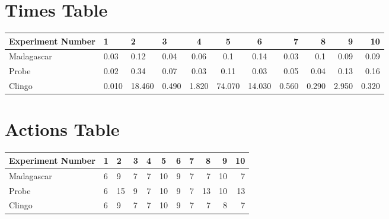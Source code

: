 \documentclass[8pt]{article}
\begin{document}
\begin{landscape}
\section{Times Table}\begin{tabular}{ | l | l | l | l | c | c | c | r | r | r | r | }\hline
Experiment Number & 1 & 2 & 3 & 4 & 5 & 6 & 7 & 8 & 9 & 10\\  \hline
Madagascar & 0.03 & 0.12 & 0.04 & 0.06 & 0.1 & 0.14 & 0.03 & 0.1 & 0.09 & 0.09\\  \hline
Probe & 0.02 & 0.34 & 0.07 & 0.03 & 0.11 & 0.03 & 0.05 & 0.04 & 0.13 & 0.16\\  \hline
Clingo & 0.010 & 18.460 & 0.490 & 1.820 & 74.070 & 14.030 & 0.560 & 0.290 & 2.950 & 0.320\\  \hline
\end{tabular}
\section{Actions Table}\begin{tabular}{ | l | l | l | l | c | c | c | r | r | r | r | }\hline
Experiment Number & 1 & 2 & 3 & 4 & 5 & 6 & 7 & 8 & 9 & 10\\ \hline
 Madagascar & 6 & 9 & 7 & 7 & 10 & 9 & 7 & 7 & 10 & 7\\ \hline
 Probe & 6 & 15 & 9 & 7 & 10 & 9 & 7 & 13 & 10 & 13\\ \hline
 Clingo & 6 & 9 & 7 & 7 & 10 & 9 & 7 & 7 & 8 & 7\\ \hline
\end{tabular}
\end{landscape}
\end{document}
